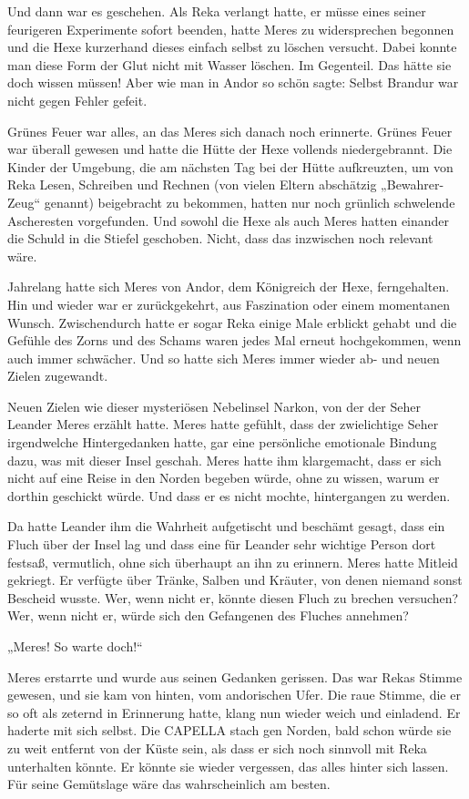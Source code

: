 \documentclass[10pt, a4paper, oneside]{book}
\begin{document}
Und dann war es geschehen. Als Reka verlangt hatte, er müsse eines seiner feurigeren Experimente sofort beenden, hatte Meres zu widersprechen begonnen und die Hexe kurzerhand dieses einfach selbst zu löschen versucht. Dabei konnte man diese Form der Glut nicht mit Wasser löschen. Im Gegenteil. Das hätte sie doch wissen müssen! Aber wie man in Andor so schön sagte: Selbst Brandur war nicht gegen Fehler gefeit.

Grünes Feuer war alles, an das Meres sich danach noch erinnerte. Grünes Feuer war überall gewesen und hatte die Hütte der Hexe vollends niedergebrannt. Die Kinder der Umgebung, die am nächsten Tag bei der Hütte aufkreuzten, um von Reka Lesen, Schreiben und Rechnen (von vielen Eltern abschätzig „Bewahrer-Zeug“ genannt) beigebracht zu bekommen, hatten nur noch grünlich schwelende Ascheresten vorgefunden. Und sowohl die Hexe als auch Meres hatten einander die Schuld in die Stiefel geschoben. Nicht, dass das inzwischen noch relevant wäre.

Jahrelang hatte sich Meres von Andor, dem Königreich der Hexe, ferngehalten. Hin und wieder war er zurückgekehrt, aus Faszination oder einem momentanen Wunsch. Zwischendurch hatte er sogar Reka einige Male erblickt gehabt und die Gefühle des Zorns und des Schams waren jedes Mal erneut hochgekommen, wenn auch immer schwächer. Und so hatte sich Meres immer wieder ab- und neuen Zielen zugewandt.

Neuen Zielen wie dieser mysteriösen Nebelinsel Narkon, von der der Seher Leander Meres erzählt hatte. Meres hatte gefühlt, dass der zwielichtige Seher irgendwelche Hintergedanken hatte, gar eine persönliche emotionale Bindung dazu, was mit dieser Insel geschah. Meres hatte ihm klargemacht, dass er sich nicht auf eine Reise in den Norden begeben würde, ohne zu wissen, warum er dorthin geschickt würde. Und dass er es nicht mochte, hintergangen zu werden.

Da hatte Leander ihm die Wahrheit aufgetischt und beschämt gesagt, dass ein Fluch über der Insel lag und dass eine für Leander sehr wichtige Person dort festsaß, vermutlich, ohne sich überhaupt an ihn zu erinnern. Meres hatte Mitleid gekriegt. Er verfügte über Tränke, Salben und Kräuter, von denen niemand sonst Bescheid wusste. Wer, wenn nicht er, könnte diesen Fluch zu brechen versuchen? Wer, wenn nicht er, würde sich den Gefangenen des Fluches annehmen?

„Meres! So warte doch!“

Meres erstarrte und wurde aus seinen Gedanken gerissen. Das war Rekas Stimme gewesen, und sie kam von hinten, vom andorischen Ufer. Die raue Stimme, die er so oft als zeternd in Erinnerung hatte, klang nun wieder weich und einladend. Er haderte mit sich selbst. Die CAPELLA stach gen Norden, bald schon würde sie zu weit entfernt von der Küste sein, als dass er sich noch sinnvoll mit Reka unterhalten könnte. Er könnte sie wieder vergessen, das alles hinter sich lassen. Für seine Gemütslage wäre das wahrscheinlich am besten.
\end{document}
